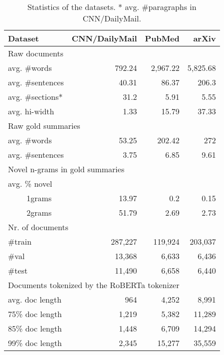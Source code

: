 \documentclass[11pt]{article}
\begin{document}
\begin{table}[ht]
\fontsize{9}{9}
\selectfont
\centering
\begin{tabular}{@{}lrrr@{}}
\toprule
\textbf{Dataset} &
  \textbf{CNN/DailyMail} &
  \textbf{PubMed} &
  \textbf{arXiv} \\ \midrule
 \multicolumn{4}{l}{Raw documents}                                                      \\ \midrule
 avg. \#words                  & 792.24          & 2,967.22 & 5,825.68  \\
 avg. \#sentences              & 40.31           & 86.37    & 206.3             \\
 avg. \#sections* & 31.2            & 5.91     & 5.55              \\
 avg.  hi-width                          & 1.33            & 15.79    & 37.33             \\ \midrule
 \multicolumn{4}{l}{Raw gold summaries}                                                           \\ \midrule 
avg. \#words              & 53.25           & 202.42   & 272               \\
avg. \#sentences          & 3.75            & 6.85     & 9.61              \\ \midrule 
\multicolumn{4}{l}{Novel n-grams in gold summaries}                                         \\ \midrule
avg. \% novel &&&\\
~~~~ 1grams                       & 13.97           & 0.2      & 0.15              \\
~~~~ 2grams                       & 51.79           & 2.69     & 2.73              \\ \midrule
\multicolumn{4}{l}{Nr. of documents} \\ \midrule 
\#train  & 287,227  & 119,924  & 203,037  \\
\#val    & 13,368   & 6,633    & 6,436  \\
\#test   & 11,490   & 6,658    & 6,440 \\\midrule
\multicolumn{4}{l}{Documents tokenized by the RoBERTa tokenizer} \\ \midrule
avg. doc length    & 964             & 4,252    & 8,991         \\
75\% doc length & 1,219           & 5,382    & 11,289            \\
85\% doc length & 1,448           & 6,709    & 14,294            \\
99\% doc length & 2,345           & 15,277   & 35,559            \\  \bottomrule
\end{tabular}
\caption[Statistics of the datasets]{Statistics of the datasets. * avg. \#paragraphs in CNN/DailyMail.}
\label{tab:datasets}
\end{table}
\end{document}
